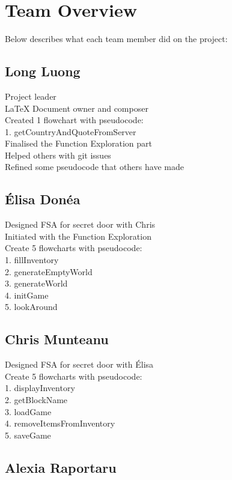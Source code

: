 \section{Team Overview} \label{section: overview}
Below describes what each team member did on the project:

\subsection{Long Luong} 
Project leader \\
LaTeX Document owner and composer \\
Created 1 flowchart with pseudocode: \\
1. getCountryAndQuoteFromServer \\
Finalised the Function Exploration part \\
Helped others with git issues \\
Refined some pseudocode that others have made

\subsection{Élisa Donéa}

Designed FSA for secret door with Chris \\
Initiated with the Function Exploration \\
Create 5 flowcharts with pseudocode: \\
1. fillInventory \\
2. generateEmptyWorld \\
3. generateWorld \\
4. initGame \\
5. lookAround \\

\subsection{Chris Munteanu}

Designed FSA for secret door with Élisa \\
Create 5 flowcharts with pseudocode: \\
1. displayInventory \\
2. getBlockName \\
3. loadGame \\
4. removeItemsFromInventory \\
5. saveGame \\

\subsection{Alexia Raportaru}

